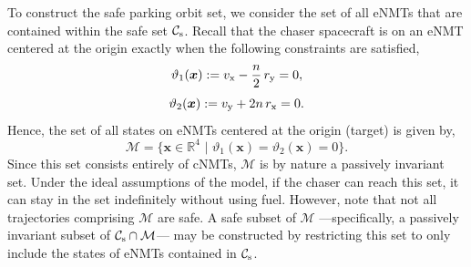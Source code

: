 \documentclass[twocolumn,letterpaper]{IEEEAerospaceCLS}  %
\theoremstyle{definition}
\begin{document}


To construct the safe parking orbit set, we consider the set of all eNMTs that are contained within the safe set ${\mathcal{C}}_{\rm s}$.
Recall that the chaser spacecraft is on an eNMT centered at the origin 
exactly when the following constraints are satisfied, 
\begin{equation} \label{eq: theta1}
  \vartheta_1(\boldsymbol{x}) := v_{\rm x} - \frac{n}{2}\, r_{\rm y} = 0,
\end{equation}
\begin{equation} \label{eq: theta2}
  \vartheta_2(\boldsymbol{x}) := v_{\rm y} + 2 n \, r_{\rm x} = 0.
\end{equation}
Hence, the set of all states on eNMTs centered at the origin (target) is given by,
\begin{equation}
  {\mathcal{M}} = \{\boldsymbol{x}\in{\mathbb{R}}^4 \,\, | \,\, \vartheta_1(\boldsymbol{x}) = \vartheta_2(\boldsymbol{x}) = 0 \}. 
\end{equation}
Since this set consists entirely of cNMTs, ${\mathcal{M}}$ is by nature a passively {invariant} set.
Under the ideal assumptions of the model, if the chaser can reach this set, it can stay in the set indefinitely without using fuel. 
However, note that not all trajectories comprising ${\mathcal{M}}$ are safe.
A safe subset of ${\mathcal{M}}$ ---specifically, a passively invariant subset of ${\mathcal{C}}_{\rm s} \cap {\mathcal{M}}$--- may be constructed by restricting this set to only include the states of eNMTs contained in ${\mathcal{C}}_{\rm s}$. 
\end{document}
